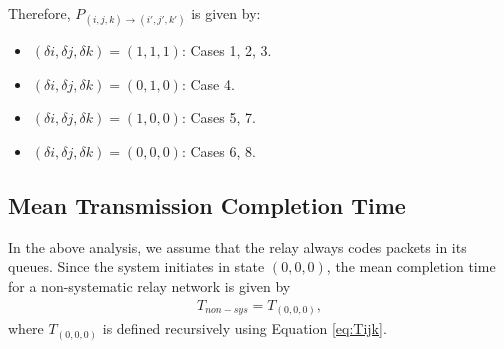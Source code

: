 Therefore, $P_{(i,j,k) \rightarrow (i',j',k')}$ is given by:

	    \begin{itemize}
            \item $(\delta i,\delta j,\delta k)=(1,1,1)$: Cases 1, 2, 3.
            \item $(\delta i,\delta j,\delta k)=(0,1,0)$: Case 4.
            \item $(\delta i,\delta j,\delta k)=(1,0,0)$: Cases 5, 7.
            \item $(\delta i,\delta j,\delta k)=(0,0,0)$: Cases 6, 8.
        \end{itemize}

	



\subsection{Mean Transmission Completion Time}

In the above analysis, we assume that the relay always codes packets in its queues. Since the system initiates in state $(0,0,0)$, the mean completion time for a non-systematic relay network is given by
\begin{align}
T_{non-sys}=T_{(0,0,0)},\label{eq:TNS}
\end{align}
where $T_{(0,0,0)}$ is defined recursively using Equation \eqref{eq:Tijk}. 